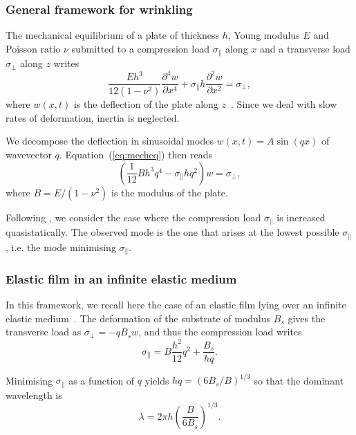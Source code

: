 \documentclass[twocolumn,superscriptaddress,showpacs,preprintnumbers,
amsmath,amssymb,prl]{revtex4-1}
\begin{document}
\subsubsection*{General framework for wrinkling}

The mechanical equilibrium of a plate of thickness $h$, Young modulus $E$ and Poisson ratio $\nu$ submitted to a compression load $\sigma_\parallel$ along $x$ and a transverse load $\sigma_\perp$ along $z$ writes
\begin{equation}
\frac{E h^3}{12(1-\nu^2)}\frac{\partial^4 w}{\partial x^4} + \sigma_\parallel h \frac{\partial^2 w}{\partial x^2} = \sigma_\perp,
\label{eq:mecheq}
\end{equation}
where $w(x,t)$ is the deflection of the plate along $z$~\cite{Biot1957}. Since we deal with slow rates of deformation, inertia is neglected.

We decompose the deflection in sinusoidal modes $w(x,t) =  A \sin (qx)$ of wavevector $q$. Equation~(\ref{eq:mecheq}) then reads
\begin{equation}
\left(\frac{1}{12} B h^3 q^4 - \sigma_\parallel h q^2\right)w = \sigma_\perp,
\label{eq:mecheqop}
\end{equation}
where $B=E/(1-\nu^2)$ is the modulus of the plate.

Following \cite{Biot1957}, we consider the case where the compression load $\sigma_\parallel$ is increased quasistatically. The observed mode is the one that arises at the lowest possible $\sigma_\parallel$, i.e. the mode minimising $\sigma_\parallel$.

\subsubsection*{Elastic film in an infinite elastic medium}

In this framework, we recall here the case of an elastic film lying over an infinite elastic medium~\cite{Gough1940,Bijlaard1946,Biot1957,Cerda2003}. The deformation of the substrate of modulus $B_s$ gives the transverse load as $\sigma_\perp = -q B_s w$, and thus the compression load writes
\begin{equation}
\sigma_\parallel = B \frac{h^2}{12} q^2 + \frac{B_s}{hq}.
\label{eq:sigma0}
\end{equation}

Minimising $\sigma_\parallel$ as a function of $q$ yields $hq = \left(6B_s/B\right)^{1/3}$ \cite{Biot1957,Cerda2003} so that the dominant wavelength is 
\begin{equation}
\lambda = 2\pi h \left(\frac{B}{6B_s}\right)^{1/3}.
\label{eq:lambdaElEl}
\end{equation}
\end{document}
